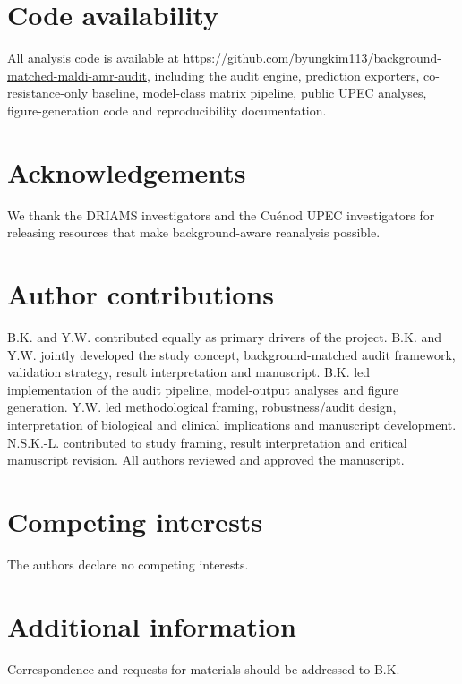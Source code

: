 \documentclass[11pt]{article}
\begin{document}
\section*{Code availability}

All analysis code is available at \url{https://github.com/byungkim113/background-matched-maldi-amr-audit}, including the audit engine, prediction exporters, co-resistance-only baseline, model-class matrix pipeline, public UPEC analyses, figure-generation code and reproducibility documentation.

\section*{Acknowledgements}

We thank the DRIAMS investigators and the Cu\'{e}nod UPEC investigators for releasing resources that make background-aware reanalysis possible.

\section*{Author contributions}

B.K. and Y.W. contributed equally as primary drivers of the project. B.K. and Y.W. jointly developed the study concept, background-matched audit framework, validation strategy, result interpretation and manuscript. B.K. led implementation of the audit pipeline, model-output analyses and figure generation. Y.W. led methodological framing, robustness/audit design, interpretation of biological and clinical implications and manuscript development. N.S.K.-L. contributed to study framing, result interpretation and critical manuscript revision. All authors reviewed and approved the manuscript.

\section*{Competing interests}

The authors declare no competing interests.

\section*{Additional information}

Correspondence and requests for materials should be addressed to B.K.



\end{document}
